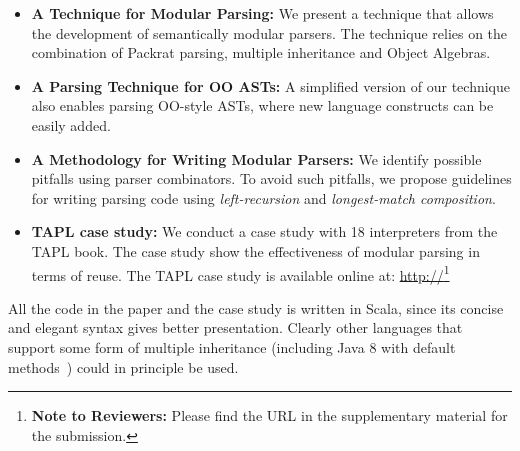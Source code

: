 \begin{itemize}[leftmargin=*]

\item \textbf{A Technique for Modular Parsing:}
  We present a technique that allows the development of semantically modular parsers.
  The technique relies on the combination of Packrat parsing, multiple inheritance
  and Object Algebras.

\item \textbf{A Parsing Technique for OO ASTs:} A simplified version of
  our technique also enables parsing OO-style ASTs, where new language
  constructs can be easily added.

\item \textbf{A Methodology for Writing Modular Parsers:} We
  identify possible pitfalls using parser combinators. To avoid such
  pitfalls, we propose guidelines for writing parsing code using
  \emph{left-recursion} and \emph{longest-match composition}.

\item \textbf{TAPL case study:} We conduct a case study with 18 interpreters
  from the TAPL book. The case study show the effectiveness of modular
  parsing in terms of reuse. The TAPL case study is available online
  at:
  \url{http://}\footnote{\textbf{Note to Reviewers:} Please find the URL in the
    supplementary material for the submission.}

\end{itemize}

All the code in the paper and the case study is written in Scala, since its concise and elegant
syntax gives better presentation. Clearly
other languages that support some form of multiple inheritance
(including Java 8 with default methods~\cite{Goetz2012}) could in principle be
used.